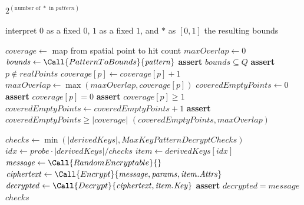 \begin{algorithm}[t]
\caption{Completeness and cryptographic verification}
\begin{algorithmic}[1]
    \State \Return $2^{(\text{number of } \ast \text{ in } \mathit{pattern})}$
\EndProcedure

        \State interpret $0$ as a fixed $0$, $1$ as a fixed $1$, and $\ast$ as $[0,1]$
    \EndFor
    \State \Return the resulting bounds
\EndProcedure

    \State $\mathit{coverage} \gets$ map from spatial point to hit count
    \State $\mathit{maxOverlap} \gets 0$
        \State $\mathit{bounds} \gets \Call{PatternToBounds}{\mathit{pattern}}$
        \State \textbf{assert} $\mathit{bounds} \subseteq Q$
            \State \textbf{assert} $p \notin \mathit{realPoints}$
            \State $\mathit{coverage}[p] \gets \mathit{coverage}[p] + 1$
            \State $\mathit{maxOverlap} \gets \max(\mathit{maxOverlap}, \mathit{coverage}[p])$
        \EndFor
    \EndFor
    \State $\mathit{coveredEmptyPoints} \gets 0$
            \State \textbf{assert} $\mathit{coverage}[p] = 0$
        \Else
            \State \textbf{assert} $\mathit{coverage}[p] \ge 1$
            \State $\mathit{coveredEmptyPoints} \gets \mathit{coveredEmptyPoints} + 1$
        \EndIf
    \EndFor
    \State \textbf{assert} $\mathit{coveredEmptyPoints} \ge |\mathit{coverage}|$
    \State \Return $(\mathit{coveredEmptyPoints}, \mathit{maxOverlap})$
\EndProcedure

    \State $\mathit{checks} \gets \min(|\mathit{derivedKeys}|, \mathit{MaxKeyPatternDecryptChecks})$
        \State $\mathit{idx} \gets \mathit{probe} \cdot |\mathit{derivedKeys}| / \mathit{checks}$
        \State $\mathit{item} \gets \mathit{derivedKeys}[\mathit{idx}]$
        \State $\mathit{message} \gets \Call{RandomEncryptable}{}$
        \State $\mathit{ciphertext} \gets \Call{Encrypt}{\mathit{message}, \mathit{params}, \mathit{item}.\mathit{Attrs}}$
        \State $\mathit{decrypted} \gets \Call{Decrypt}{\mathit{ciphertext}, \mathit{item}.\mathit{Key}}$
        \State \textbf{assert} $\mathit{decrypted} = \mathit{message}$
    \EndFor
    \State \Return $\mathit{checks}$ 
\EndProcedure
\end{algorithmic}
\end{algorithm}

